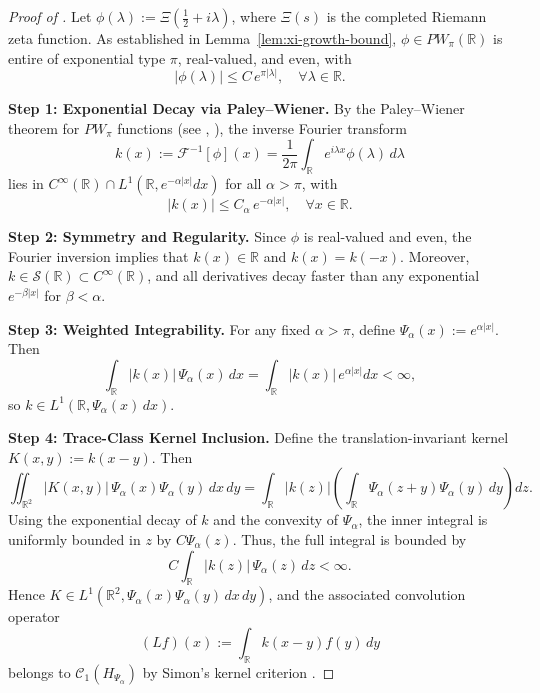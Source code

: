 \begin{proof}[Proof of ]
Let \( \phi(\lambda) := \Xi\left( \tfrac{1}{2} + i\lambda \right) \), where \( \Xi(s) \) is the completed Riemann zeta function. As established in Lemma~\ref{lem:xi-growth-bound}, \( \phi \in PW_\pi(\mathbb{R}) \) is entire of exponential type \( \pi \), real-valued, and even, with
\[
|\phi(\lambda)| \le C\, e^{\pi |\lambda|}, \quad \forall \lambda \in \mathbb{R}.
\]

\medskip
\noindent\textbf{Step 1: Exponential Decay via Paley–Wiener.}
By the Paley–Wiener theorem for \( PW_\pi \) functions (see \cite[Thm.~3.2.4]{Levin1996EntireLectures}, \cite[Ch.~IX.4]{ReedSimon1975II}), the inverse Fourier transform
\[
k(x) := \mathscr{F}^{-1}[\phi](x) = \frac{1}{2\pi} \int_{\mathbb{R}} e^{i\lambda x} \phi(\lambda)\, d\lambda
\]
lies in \( C^\infty(\mathbb{R}) \cap L^1(\mathbb{R}, e^{-\alpha |x|} dx) \) for all \( \alpha > \pi \), with
\[
|k(x)| \le C_\alpha\, e^{-\alpha |x|}, \quad \forall x \in \mathbb{R}.
\]

\medskip
\noindent\textbf{Step 2: Symmetry and Regularity.}
Since \( \phi \) is real-valued and even, the Fourier inversion implies that \( k(x) \in \mathbb{R} \) and \( k(x) = k(-x) \). Moreover, \( k \in \mathcal{S}(\mathbb{R}) \subset C^\infty(\mathbb{R}) \), and all derivatives decay faster than any exponential \( e^{-\beta |x|} \) for \( \beta < \alpha \).

\medskip
\noindent\textbf{Step 3: Weighted Integrability.}
For any fixed \( \alpha > \pi \), define \( \Psi_\alpha(x) := e^{\alpha |x|} \). Then
\[
\int_{\mathbb{R}} |k(x)|\, \Psi_\alpha(x)\, dx = \int_{\mathbb{R}} |k(x)|\, e^{\alpha |x|} dx < \infty,
\]
so \( k \in L^1(\mathbb{R}, \Psi_\alpha(x)\, dx) \).

\medskip
\noindent\textbf{Step 4: Trace-Class Kernel Inclusion.}
Define the translation-invariant kernel \( K(x,y) := k(x - y) \). Then
\[
\iint_{\mathbb{R}^2} |K(x,y)|\, \Psi_\alpha(x)\Psi_\alpha(y)\, dx\, dy
= \int_{\mathbb{R}} |k(z)| \left( \int_{\mathbb{R}} \Psi_\alpha(z + y)\Psi_\alpha(y)\, dy \right) dz.
\]
Using the exponential decay of \( k \) and the convexity of \( \Psi_\alpha \), the inner integral is uniformly bounded in \( z \) by \( C \Psi_\alpha(z) \). Thus, the full integral is bounded by
\[
C \int_{\mathbb{R}} |k(z)|\, \Psi_\alpha(z)\, dz < \infty.
\]
Hence \( K \in L^1(\mathbb{R}^2, \Psi_\alpha(x)\Psi_\alpha(y)\, dx\, dy) \), and the associated convolution operator
\[
(Lf)(x) := \int_{\mathbb{R}} k(x - y) f(y)\, dy
\]
belongs to \( \mathcal{C}_1(H_{\Psi_\alpha}) \) by Simon’s kernel criterion \cite[Thm.~4.2]{Simon2005TraceIdeals}.
\end{proof}
